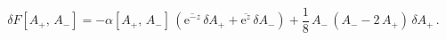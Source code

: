 \begin{equation}\label{Fa}
\delta F[A_+,\,A_-]  =
-\alpha[A_+,\,A_-]\,(\overline{{\mathrm{e}}^{-z}}\,\delta A_+ +
\overline{{\mathrm{e}}^{z}}\,\delta A_-) + \frac{1}{8} \,A_-\,(A_- - 2\,
A_+)\,\delta A_+\,.
\end{equation}

